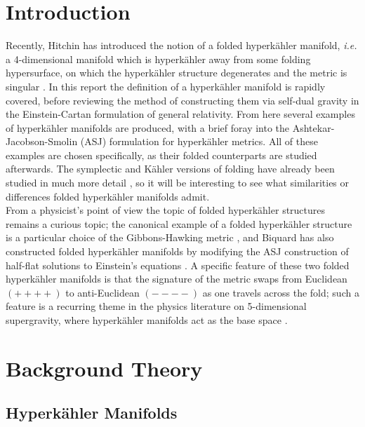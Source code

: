 \documentclass[a4paper,12pt, onecolumn, notitlepage]{article}
\theoremstyle{definition}
\theoremstyle{remark}
\newcommand{\ie}{\emph{i.e.} }
\newcommand{\K}{K\"ahler }
\newcommand{\HK}{hyperk\"ahler }
\begin{document}
\section{Introduction}
Recently, Hitchin has introduced the notion of a folded hyperk{\"a}hler manifold, \ie a 4-dimensional manifold which is hyperk{\"a}hler away from some folding hypersurface, on which the hyperk{\"a}hler structure degenerates and the metric is singular \cite{hitchin_2015,biquard_2015}. In this report the definition of a \HK manifold is rapidly covered, before reviewing the method of constructing them via self-dual gravity in the Einstein-Cartan formulation of general relativity. From here several examples of \HK manifolds are produced, with a brief foray into the Ashtekar-Jacobson-Smolin (ASJ) formulation for \HK metrics. All of these examples are chosen specifically, as their folded counterparts are studied afterwards. The symplectic and \K versions of folding have already been studied in much more detail \cite{dasilva_2000,baykur_2006}, so it will be interesting to see what similarities or differences folded \HK manifolds admit.\\
From a physicist's point of view the topic of folded \HK structures remains a curious topic; the canonical example of a folded \HK structure is a particular choice of the Gibbons-Hawking metric \cite{hitchin_2015}, and Biquard has also constructed folded \HK manifolds by modifying the ASJ construction of half-flat solutions to Einstein's equations \cite{biquard_2015, ashtekar_1988}. A specific feature of these two folded \HK manifolds is that the signature of the metric swaps from Euclidean $(++++)$ to anti-Euclidean $(----)$ as one travels across the fold; such a feature is a recurring theme in the physics literature on 5-dimensional supergravity, where \HK manifolds act as the base space \cite{gibbons_2013}.


\section{Background Theory}
\subsection{Hyperk\"ahler Manifolds}
\end{document}
